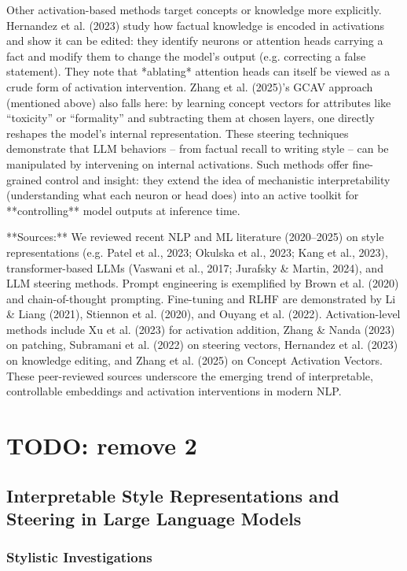 Other activation-based methods target concepts or knowledge more explicitly.  Hernandez et al. (2023) study how factual knowledge is encoded in activations and show it can be edited: they identify neurons or attention heads carrying a fact and modify them to change the model’s output (e.g. correcting a false statement). They note that *ablating* attention heads can itself be viewed as a crude form of activation intervention.  Zhang et al. (2025)’s GCAV approach (mentioned above) also falls here: by learning concept vectors for attributes like “toxicity” or “formality” and subtracting them at chosen layers, one directly reshapes the model’s internal representation.  These steering techniques demonstrate that LLM behaviors – from factual recall to writing style – can be manipulated by intervening on internal activations. Such methods offer fine-grained control and insight: they extend the idea of mechanistic interpretability (understanding what each neuron or head does) into an active toolkit for **controlling** model outputs at inference time.

**Sources:** We reviewed recent NLP and ML literature (2020–2025) on style representations (e.g. Patel et al., 2023; Okulska et al., 2023; Kang et al., 2023), transformer-based LLMs (Vaswani et al., 2017; Jurafsky \& Martin, 2024), and LLM steering methods.  Prompt engineering is exemplified by Brown et al. (2020) and chain-of-thought prompting.  Fine-tuning and RLHF are demonstrated by Li \& Liang (2021), Stiennon et al. (2020), and Ouyang et al. (2022).  Activation-level methods include Xu et al. (2023) for activation addition, Zhang \& Nanda (2023) on patching, Subramani et al. (2022) on steering vectors, Hernandez et al. (2023) on knowledge editing, and Zhang et al. (2025) on Concept Activation Vectors. These peer-reviewed sources underscore the emerging trend of interpretable, controllable embeddings and activation interventions in modern NLP.

\section{TODO: remove 2}
\subsection*{Interpretable Style Representations and Steering in Large Language Models}

\subsubsection*{Stylistic Investigations}


